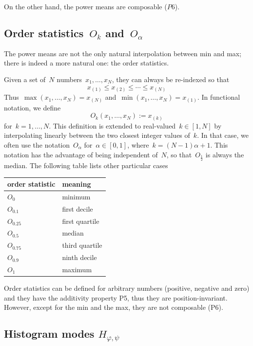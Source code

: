 On the other hand, the power means are composable ($P6$).

\subsection{Order statistics~$O_k$ and~$O_{\alpha}$}

The power means are not the only natural interpolation between min
and max; there is indeed a more natural one: the order statistics.

Given a set of~$N$ numbers~$x_1,\ldots,x_N$, they can always be
re-indexed so that
\[
	x_{(1)} \le x_{(2)} \le \cdots \le x_{(N)}
\]
Thus~$\max(x_1,\ldots,x_N)=x_{(N)}$
and~$\min(x_1,\ldots,x_N)=x_{(1)}$.  In functional notation, we
define
\[
	O_k(x_1,\ldots,x_N) := x_{(k)}
\]
for~$k=1,\ldots,N$.  This definition is extended to
real-valued~$k\in[1,N]$ by interpolating linearly between the
two closest integer values of~$k$.  In that case, we often use the
notation~$O_{\alpha}$ for~$\alpha\in[0,1]$, where~$k=(N-1)\alpha+1$.
This notation has the advantage of being independent of~$N$, so
that~$O_{\frac{1}{2}}$ is always the median.  The following table
lists other particular cases

\medskip

\begin{tabular}{l|l}
	order statistic & meaning \\
	\hline
	$O_0$ & minimum \\
	$O_{0.1}$ & first decile \\
	$O_{0.25}$ & first quartile \\
	$O_{0.5}$ & median \\
	$O_{0.75}$ & third quartile \\
	$O_{0.9}$ & ninth decile \\
	$O_1$ & maximum \\
\end{tabular}

\medskip

Order statistics can be defined for arbitrary numbers (positive,
negative and zero) and they have the additivity property P5, thus
they are position-invariant.  However, except for the min and the
max, they are not composable (P6).


\subsection{Histogram modes $H_{\varphi,\psi}$}


